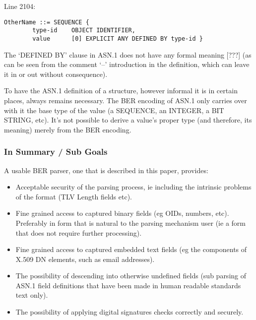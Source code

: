 Line 2104:

\begin{changemargin}{-60mm}{0mm}
\begin{myquote}
\begin{verbatim}
OtherName ::= SEQUENCE {
        type-id    OBJECT IDENTIFIER,
        value      [0] EXPLICIT ANY DEFINED BY type-id }
\end{verbatim}
\end{myquote}
\end{changemargin}

The ‘DEFINED BY’ clause in ASN.1 does not have any formal meaning 
[???] (as can be seen from the comment ‘--’ introduction in the 
definition, which can leave it in or out without consequence).


To have the ASN.1 definition of a structure, however informal it is in 
certain places, always remains necessary. The BER encoding of ASN.1 only 
carries over with it the base type of the value (a SEQUENCE, an INTEGER, a 
BIT STRING, etc). It’s not possible to derive a value’s proper type 
(and therefore, its meaning) merely from the BER encoding.

\subsubsection{In Summary / Sub Goals}
A usable BER parser, one that is described in this paper, provides:

\begin{itemize}
    \item Acceptable security of the parsing process, ie including the 
intrinsic problems of the format (TLV Length fields etc).
    \item Fine grained access to captured binary fields (eg OIDs, numbers, 
etc). Preferably in form that is natural to the parsing mechanism user (ie 
a form that does not require further processing).
    \item Fine grained access to captured embedded text fields (eg the 
components of X.509 DN elements, such as email addresses).
    \item The possibility of descending into otherwise undefined fields (sub 
parsing of ASN.1 field definitions that have been made in human readable 
standards text only).
    \item The possibility of applying digital signatures checks correctly 
and securely.
\end{itemize}

